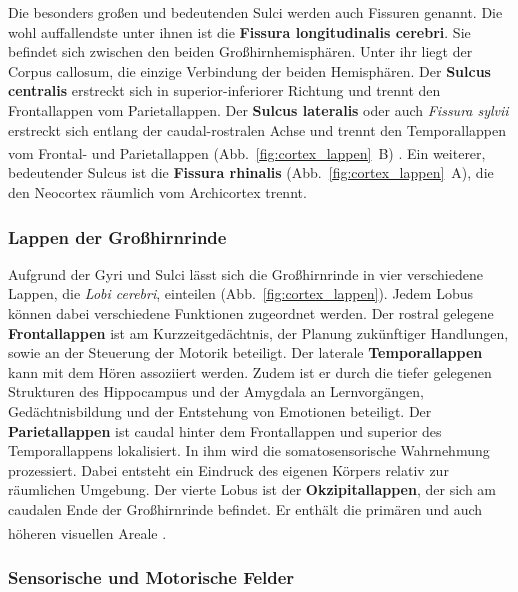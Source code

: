 \documentclass[12pt,a4paper,pdftex]{article}
\begin{document}
\noindent Die besonders großen und bedeutenden Sulci werden auch Fissuren genannt. Die wohl auffallendste unter ihnen ist die \textbf{Fissura longitudinalis cerebri}. Sie befindet sich zwischen den beiden Großhirnhemisphären. Unter ihr liegt der Corpus callosum, die einzige Verbindung der beiden Hemisphären. Der \textbf{Sulcus centralis} erstreckt sich in superior-inferiorer Richtung und trennt den Frontallappen vom Parietallappen. Der \textbf{Sulcus lateralis} oder auch \textit{Fissura sylvii} erstreckt sich entlang der caudal-rostralen Achse und trennt den Temporallappen vom Frontal- und Parietallappen (Abb.~\ref{fig:cortex_lappen}~B) \textsuperscript{\cite[7]{neurowissenschaften_baer}}. Ein weiterer, bedeutender Sulcus ist die \textbf{Fissura rhinalis} (Abb.~\ref{fig:cortex_lappen}~A), die den Neocortex räumlich vom Archicortex trennt. 

\subsubsection*{Lappen der Großhirnrinde}

Aufgrund der Gyri und Sulci lässt sich die Großhirnrinde in vier verschiedene Lappen, die \textit{Lobi cerebri}, einteilen (Abb.~\ref{fig:cortex_lappen}). Jedem Lobus können dabei verschiedene Funktionen zugeordnet werden. Der rostral gelegene \textbf{Frontallappen} ist am Kurzzeitgedächtnis, der Planung zukünftiger Handlungen, sowie an der Steuerung der Motorik beteiligt. Der laterale \textbf{Temporallappen} kann mit dem Hören assoziiert werden. Zudem ist er durch die tiefer gelegenen Strukturen des Hippocampus und der Amygdala an Lernvorgängen, Gedächtnisbildung und der Entstehung von Emotionen beteiligt. Der \textbf{Parietallappen} ist caudal hinter dem Frontallappen und superior des Temporallappens lokalisiert. In ihm wird die somatosensorische Wahrnehmung prozessiert. Dabei entsteht ein Eindruck des eigenen Körpers relativ zur räumlichen Umgebung. Der vierte Lobus ist der \textbf{Okzipitallappen}, der sich am caudalen Ende der Großhirnrinde befindet. Er enthält die primären und auch höheren visuellen Areale \textsuperscript{\cite[1]{kandel2013principles}}.

\subsubsection*{Sensorische und Motorische Felder}
\label{subsubsec:Sens_Mot_Felder}
\end{document}
